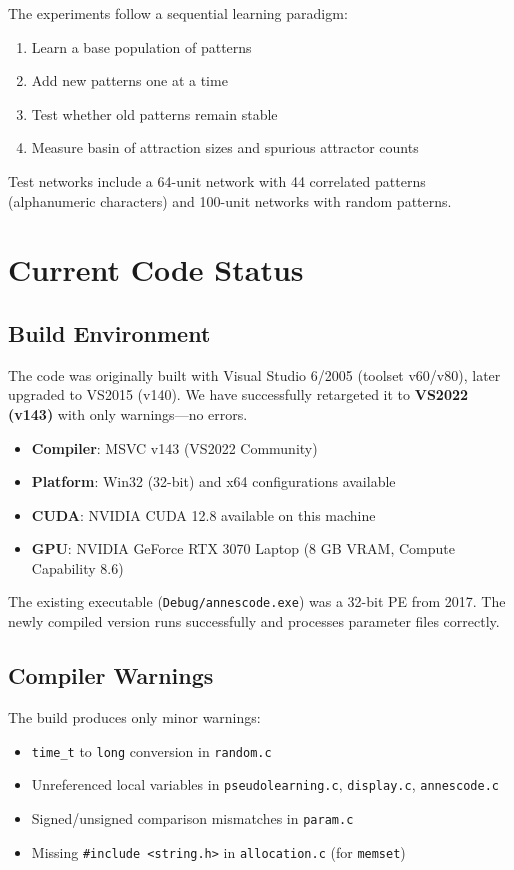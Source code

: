 \documentclass[11pt,a4paper]{article}
\begin{document}
The experiments follow a sequential learning paradigm:
\begin{enumerate}
    \item Learn a base population of patterns
    \item Add new patterns one at a time
    \item Test whether old patterns remain stable
    \item Measure basin of attraction sizes and spurious attractor counts
\end{enumerate}

Test networks include a 64-unit network with 44 correlated patterns (alphanumeric characters) and 100-unit networks with random patterns.

\section{Current Code Status}

\subsection{Build Environment}

The code was originally built with Visual Studio 6/2005 (toolset v60/v80), later upgraded to VS2015 (v140). We have successfully retargeted it to \textbf{VS2022 (v143)} with only warnings---no errors.

\begin{itemize}
    \item \textbf{Compiler}: MSVC v143 (VS2022 Community)
    \item \textbf{Platform}: Win32 (32-bit) and x64 configurations available
    \item \textbf{CUDA}: NVIDIA CUDA 12.8 available on this machine
    \item \textbf{GPU}: NVIDIA GeForce RTX 3070 Laptop (8 GB VRAM, Compute Capability 8.6)
\end{itemize}

The existing executable (\texttt{Debug/annescode.exe}) was a 32-bit PE from 2017. The newly compiled version runs successfully and processes parameter files correctly.

\subsection{Compiler Warnings}

The build produces only minor warnings:
\begin{itemize}
    \item \texttt{time\_t} to \texttt{long} conversion in \texttt{random.c}
    \item Unreferenced local variables in \texttt{pseudolearning.c}, \texttt{display.c}, \texttt{annescode.c}
    \item Signed/unsigned comparison mismatches in \texttt{param.c}
    \item Missing \texttt{\#include <string.h>} in \texttt{allocation.c} (for \texttt{memset})
\end{itemize}
\end{document}
